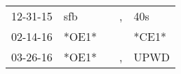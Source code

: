 \begin{supertabular}{p{0.07\textwidth}p{0.06\textwidth}p{0.02\textwidth}p{0.02\textwidth}p{0.06\textwidth}}
 12-31-15\textsuperscript{} &  sfb\textsuperscript{} &   &  , &   40s\textsuperscript{} \\
 02-14-16\textsuperscript{} &                  *OE1* &   &    &                   *CE1* \\
 03-26-16\textsuperscript{} &                  *OE1* &   &  , &  UPWD\textsuperscript{} \\
\end{supertabular}
